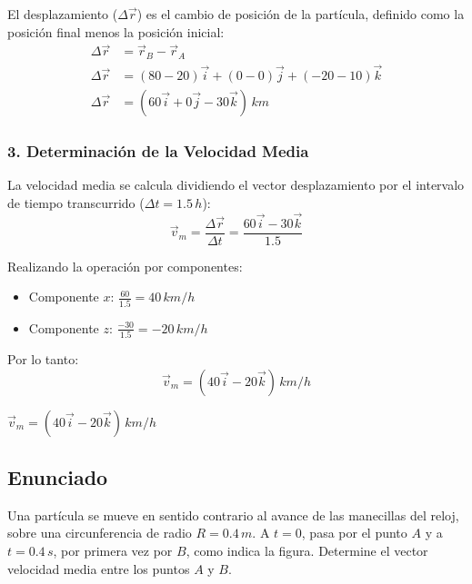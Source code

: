 \documentclass[12pt, a4paper]{article}
\begin{document}
El desplazamiento ($\Delta\vec{r}$) es el cambio de posición de la partícula, definido como la posición final menos la posición inicial:
\begin{align*}
    \Delta\vec{r} &= \vec{r}_B - \vec{r}_A \\
    \Delta\vec{r} &= (80 - 20)\vec{i} + (0 - 0)\vec{j} + (-20 - 10)\vec{k} \\
    \Delta\vec{r} &= (60\vec{i} + 0\vec{j} - 30\vec{k}) \, \si{km}
\end{align*}

\subsubsection*{3. Determinación de la Velocidad Media}

La velocidad media se calcula dividiendo el vector desplazamiento por el intervalo de tiempo transcurrido ($\Delta t = 1.5 \, \si{h}$):
\begin{equation}
    \vec{v}_m = \frac{\Delta\vec{r}}{\Delta t} = \frac{60\vec{i} - 30\vec{k}}{1.5}
\end{equation}

Realizando la operación por componentes:
\begin{itemize}
    \item Componente $x$: $\frac{60}{1.5} = 40 \, \si{km/h}$
    \item Componente $z$: $\frac{-30}{1.5} = -20 \, \si{km/h}$
\end{itemize}

Por lo tanto:
\begin{equation}
    \vec{v}_m = (40\vec{i} - 20\vec{k}) \, \si{km/h}
\end{equation}

\begin{tcolorbox}[colback=green!5!white, colframe=green!50!black, title=Respuesta Final]
\centering \Large $\vec{v}_m = (40\vec{i} - 20\vec{k}) \, \si{km/h}$
\end{tcolorbox}

\newpage

\subsection*{Enunciado}

Una partícula se mueve en sentido contrario al avance de las manecillas del reloj, sobre una circunferencia de radio $R = 0.4 \, \si{m}$. A $t = 0$, pasa por el punto $A$ y a $t = 0.4 \, \si{s}$, por primera vez por $B$, como indica la figura. Determine el vector velocidad media entre los puntos $A$ y $B$.
\end{document}
